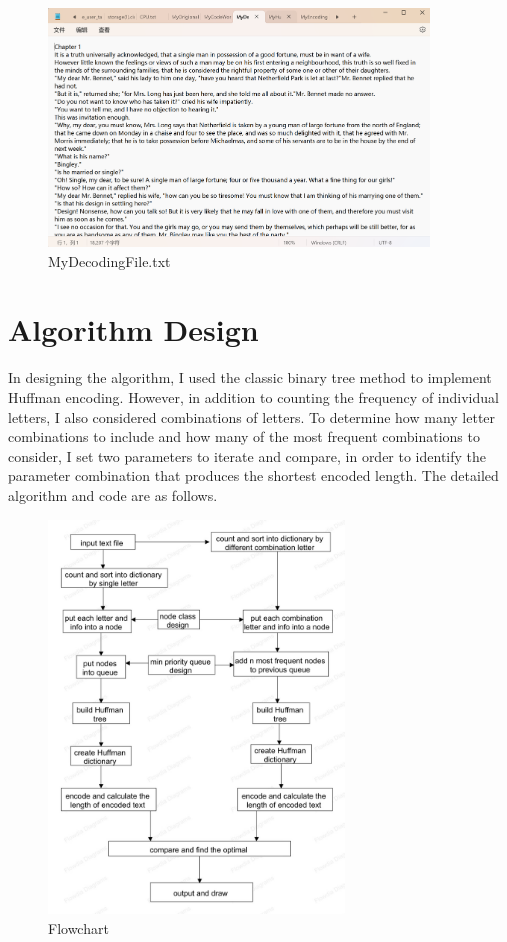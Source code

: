 \documentclass[12pt]{article}
\begin{document}
\begin{figure}[htbp]
    \centering
    \includegraphics[width=0.9\textwidth]{decode.png}
    \caption{MyDecodingFile.txt}
    \label{pic7}
\end{figure}

\newpage
\section{Algorithm Design}
\par In designing the algorithm, I used the classic binary tree method to implement Huffman encoding. However, in addition to counting the frequency of individual letters, I also considered combinations of letters. To determine how many letter combinations to include and how many of the most frequent combinations to consider, I set two parameters to iterate and compare, in order to identify the parameter combination that produces the shortest encoded length. The detailed algorithm and code are as follows.
\begin{figure}[htbp]
    \centering
    \includegraphics[width=0.7\textwidth]{flowchart.png}
    \caption{Flowchart}
    \label{pic8}
\end{figure}
\end{document}

